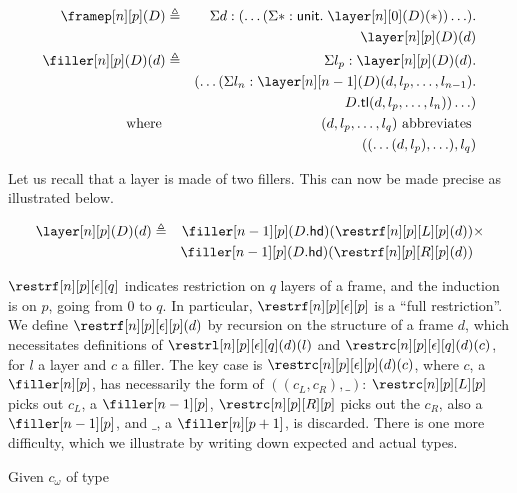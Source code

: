 \documentclass[10pt]{art.cls/art}
\newcommand{\unittype}{\ensuremath{\mathsf{unit}}}
\newcommand{\unitpoint}{\ensuremath{\ast}}
\newcommand{\defeq}{\ensuremath{\triangleq}}
\newcommand{\tl}{\ensuremath{\mathsf{tl}}}
\newcommand{\hd}{\ensuremath{\mathsf{hd}}}
\begin{document}
\begin{align*}
  \framep[n][p](D)    & \defeq & \Sigma d : (\ldots (\Sigma \unitpoint: \unittype .\; \layer[n][0](D)(\unitpoint)) \ldots) . \\
                      &        & \layer[n][p](D)(d)                                                                          \\
  \filler[n][p](D)(d) & \defeq & \Sigma l_p: \layer[n][p](D)(d) .                                                            \\
                      &        & (\ldots (\Sigma l_n : \layer[n][n - 1](D)(d, l_p, \ldots, l_{n - 1}) .                      \\
                      &        & D.\tl(d, l_p, \ldots, l_n)) \ldots)                                                         \\
  \text{where}\;      &        & (d, l_p, \ldots, l_q) \text{ abbreviates }                                                  \\
                      &        & ((\ldots(d, l_p), \ldots), l_q)
\end{align*}

Let us recall that a layer is made of two fillers. This can now be made precise as illustrated below.

\begin{align*}
  \layer[n][p](D)(d) & \defeq & \filler[n-1][p](D.\hd)(\restrf[n][p][L][p](d)) & \times \\
                     &        & \filler[n-1][p](D.\hd)(\restrf[n][p][R][p](d)) &
\end{align*}

$\restrf[n][p][\epsilon][q]$ indicates restriction on $q$ layers of a frame, and the induction is on $p$, going from $0$ to $q$. In particular, $\restrf[n][p][\epsilon][p]$ is a ``full restriction''. We define $\restrf[n][p][\epsilon][p](d)$ by recursion on the structure of a frame $d$, which necessitates definitions of $\restrl[n][p][\epsilon][q](d)(l)$ and $\restrc[n][p][\epsilon][q](d)(c)$, for $l$ a layer and $c$ a filler. The key case is $\restrc[n][p][\epsilon][p](d)(c)$, where $c$, a $\filler[n][p]$, has necessarily the form of $((c_L, c_R), \_)$: $\restrc[n][p][L][p]$ picks out $c_L$, a $\filler[n-1][p]$, $\restrc[n][p][R][p]$ picks out the $c_R$, also a $\filler[n-1][p]$, and $\_$, a $\filler[n][p+1]$, is discarded. There is one more difficulty, which we illustrate by writing down expected and actual types.

Given $c_\omega$ of type
\end{document}
